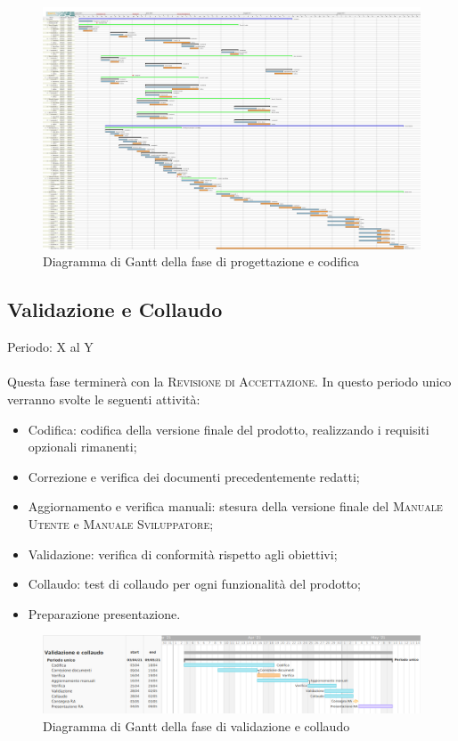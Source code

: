 \documentclass[../piano_di_progetto.tex]{subfiles}
\begin{document}
\begin{landscape}
    \begin{figure}
    \centering
    \includegraphics[width=1\textwidth, width=200mm, angle=90]{src/img/gantt/pianificazione_riveduta_RQ.jpg}
    \caption{Diagramma di Gantt della fase di progettazione e codifica}
    \end{figure}
\end{landscape}%


\subsection{Validazione e Collaudo}%
\label{sub:valid_coll}
Periodo: X al Y \\ \\ 
Questa fase terminerà con la \textsc{Revisione di Accettazione}. In questo periodo unico verranno svolte le seguenti attività:

\begin{itemize}
    \item Codifica: codifica della versione finale del prodotto, realizzando i requisiti opzionali rimanenti;
    \item Correzione e verifica dei documenti precedentemente redatti;
    \item Aggiornamento e verifica manuali: stesura della versione finale del \textsc{Manuale Utente} e \textsc{Manuale Sviluppatore};
    \item Validazione: verifica di conformità rispetto agli obiettivi;
    \item Collaudo: test di collaudo per ogni funzionalità del prodotto;
    \item Preparazione presentazione.
\end{itemize}


\begin{figure}[H]
\centering
\includegraphics[width=18cm]{src/img/gantt/04_RA_alternative.png}
\caption{Diagramma di Gantt della fase di validazione e collaudo}
\end{figure}
\end{document}
